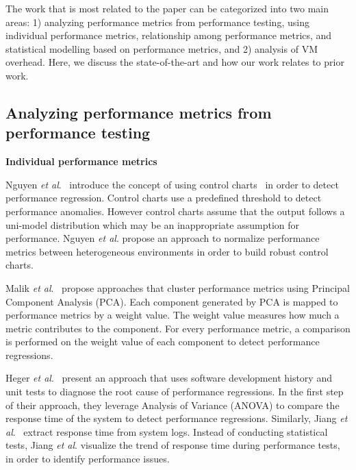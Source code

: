 The work that is most related to the paper can be categorized into two main areas: 1) analyzing performance metrics from performance testing, using individual performance metrics, relationship among performance metrics, and statistical modelling based on performance metrics, and 2) analysis of VM overhead. Here, we discuss the state-of-the-art and how our work relates to prior work.

\subsection{Analyzing performance metrics from performance testing} 

\noindent \textbf{Individual performance metrics}

Nguyen \textit{et al$.$}~\cite{Nguyen:2012:ADP:2188286.2188344} introduce the concept of using control charts~\cite{shewhart1931economic} in order to detect performance regression. Control charts use a predefined threshold to detect performance anomalies. However control charts assume that the output follows a uni-model distribution which may be an inappropriate assumption for performance. Nguyen \textit{ et al$.$} propose an approach to normalize performance metrics between heterogeneous environments in order to build robust control charts. %

Malik \emph{et al$.$}~\cite{Malik:2010:ACL:1955601.1955936, haroon} propose approaches that cluster performance metrics using Principal Component Analysis (PCA). Each component generated by PCA is mapped to performance metrics by a weight value. The weight value measures how much a metric contributes to the component. For every performance metric, a comparison is performed on the weight value of each component to detect performance regressions.

Heger \emph{et al$.$}~\cite{DBLP:conf/wosp/HegerHF13} present an approach that uses software development history and unit tests to diagnose the root cause of performance regressions. In the first step of their approach, they leverage Analysis of Variance (ANOVA) to compare the response time of the system to detect performance regressions. Similarly, Jiang \emph{et al$.$}~\cite{jackicsm2009} extract response time from system logs. Instead of conducting statistical tests, Jiang \emph{et al$.$} visualize the trend of response time during performance tests, in order to identify performance issues.


